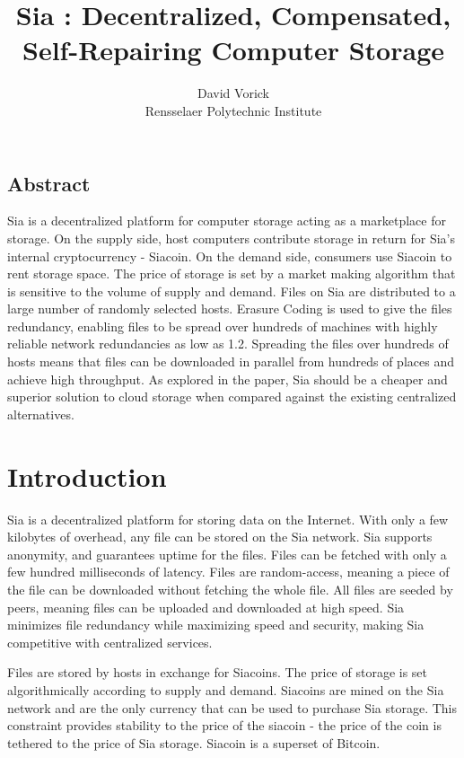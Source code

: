 \documentclass[twocolumn]{article}
\begin{document}
\frenchspacing

\title{Sia : Decentralized, Compensated, Self-Repairing Computer Storage}

\author{
{\rm David Vorick}\\
Rensselaer Polytechnic Institute
}

\maketitle

\subsection*{Abstract}
Sia is a decentralized platform for computer storage acting as a marketplace for storage.
On the supply side, host computers contribute storage in return for Sia's internal cryptocurrency - Siacoin.
On the demand side, consumers use Siacoin to rent storage space.
The price of storage is set by a market making algorithm that is sensitive to the volume of supply and demand.
Files on Sia are distributed to a large number of randomly selected hosts.
Erasure Coding is used to give the files redundancy, enabling files to be spread over hundreds of machines with highly reliable network redundancies as low as 1.2.
Spreading the files over hundreds of hosts means that files can be downloaded in parallel from hundreds of places and achieve high throughput.
As explored in the paper, Sia should be a cheaper and superior solution to cloud storage when compared against the existing centralized alternatives.

\section{Introduction}

Sia is a decentralized platform for storing data on the Internet.
With only a few kilobytes of overhead, any file can be stored on the Sia network.
Sia supports anonymity, and guarantees uptime for the files.
Files can be fetched with only a few hundred milliseconds of latency.
Files are random-access, meaning a piece of the file can be downloaded without fetching the whole file.
All files are seeded by \numhosts{} peers, meaning files can be uploaded and downloaded at high speed.
Sia minimizes file redundancy while maximizing speed and security, making Sia competitive with centralized services.

Files are stored by hosts in exchange for Siacoins.
The price of storage is set algorithmically according to supply and demand.
Siacoins are mined on the Sia network and are the only currency that can be used to purchase Sia storage.
This constraint provides stability to the price of the siacoin - the price of the coin is tethered to the price of Sia storage.
Siacoin is a superset of Bitcoin.
\end{document}
